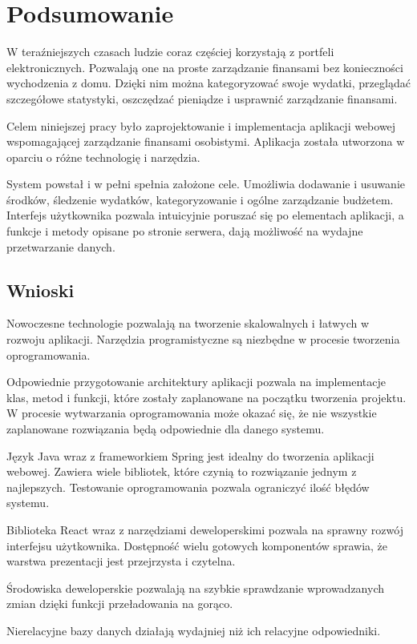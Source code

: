 \chapter{Podsumowanie}
W teraźniejszych czasach ludzie coraz częściej korzystają z portfeli elektronicznych. Pozwalają one na proste zarządzanie finansami bez konieczności wychodzenia z domu. Dzięki nim można kategoryzować swoje wydatki, przeglądać szczegółowe statystyki, oszczędzać pieniądze i usprawnić zarządzanie finansami. 

Celem niniejszej pracy było zaprojektowanie i implementacja aplikacji webowej wspomagającej zarządzanie finansami osobistymi. Aplikacja została utworzona w oparciu o różne technologię i narzędzia.

System powstał i w pełni spełnia założone cele. Umożliwia dodawanie i usuwanie środków, śledzenie wydatków, kategoryzowanie i ogólne zarządzanie budżetem. Interfejs użytkownika pozwala intuicyjnie poruszać się po elementach aplikacji, a funkcje i metody opisane po stronie serwera, dają możliwość na wydajne przetwarzanie danych. 
\section*{Wnioski}
Nowoczesne technologie pozwalają na tworzenie skalowalnych i łatwych w rozwoju aplikacji. Narzędzia programistyczne są niezbędne w procesie tworzenia oprogramowania. 

Odpowiednie przygotowanie architektury aplikacji pozwala na implementacje klas, metod i funkcji, które zostały zaplanowane na początku tworzenia projektu. 
W procesie wytwarzania oprogramowania może okazać się, że nie wszystkie zaplanowane rozwiązania będą odpowiednie dla danego systemu.

Język Java wraz z frameworkiem Spring jest idealny do tworzenia aplikacji webowej. Zawiera wiele bibliotek, które czynią to rozwiązanie jednym z najlepszych. Testowanie oprogramowania pozwala ograniczyć ilość błędów systemu. 

Biblioteka React wraz z narzędziami deweloperskimi pozwala na sprawny rozwój interfejsu użytkownika. Dostępność wielu gotowych komponentów sprawia, że warstwa prezentacji jest przejrzysta i czytelna. 

Środowiska deweloperskie pozwalają na szybkie sprawdzanie wprowadzanych zmian dzięki funkcji przeładowania na gorąco. 

Nierelacyjne bazy danych działają wydajniej niż ich relacyjne odpowiedniki. 

